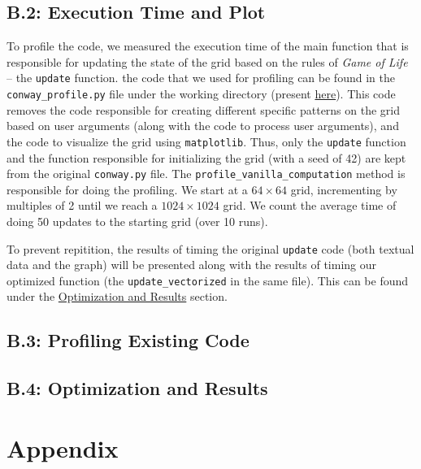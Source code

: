\documentclass[a4paper,12pt]{article}
\begin{document}
\subsection{B.2: Execution Time and Plot}
To profile the code, we measured the execution time of the main function that is responsible for updating the state of the grid based on the rules of \textit{Game of Life} -- the \verb|update| function. the code that we used for profiling can be found in the \verb|conway_profile.py| file under the working directory (present \href{https://github.com/paulmyr/DD2358-HPC25/blob/master/02_hpcds/bonus/conway_profile.py}{here}). This code removes the code responsible for creating different specific patterns on the grid based on user arguments (along with the code to process user arguments), and the code to visualize the grid using \verb|matplotlib|. Thus, only the \verb|update| function and the function responsible for initializing the grid (with a seed of 42) are kept from the original \verb|conway.py| file. The \verb|profile_vanilla_computation| method is responsible for doing the profiling. We start at a $64 \times 64$ grid, incrementing by multiples of 2 until we reach a $1024 \times 1024$ grid. We count the average time of doing 50 updates to the starting grid (over 10 runs). 

To prevent repitition, the results of timing the original \verb|update| code (both textual data and the graph) will be presented along with the results of timing our optimized function (the \verb|update_vectorized| in the same file). This can be found under the \hyperref[sec:b4]{Optimization and Results} section.

\subsection{B.3: Profiling Existing Code}


\subsection{B.4: Optimization and Results}
\label{sec:b4}
\section{Appendix}


\end{document}
